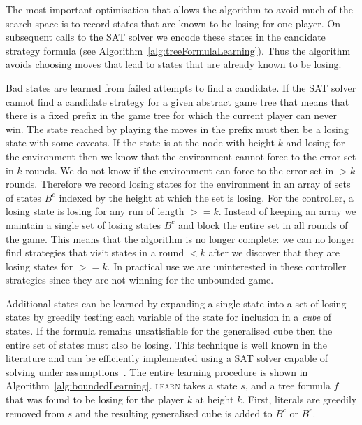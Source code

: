 The most important optimisation that allows the algorithm to avoid much of the search space is to record states that are known to be losing for one player. On subsequent calls to the SAT solver we encode these states in the candidate strategy formula (see Algorithm~\ref{alg:treeFormulaLearning}). Thus the algorithm avoids choosing moves that lead to states that are already known to be losing.

Bad states are learned from failed attempts to find a candidate. If the SAT solver cannot find a candidate strategy for a given abstract game tree that means that there is a fixed prefix in the game tree for which the current player can never win. The state reached by playing the moves in the prefix must then be a losing state with some caveats. If the state is at the node with height $k$ and losing for the environment then we know that the environment cannot force to the error set in $k$ rounds. We do not know if the environment can force to the error set in $> k$ rounds. Therefore we record losing states for the environment in an array of sets of states $B^e$ indexed by the height at which the set is losing. For the controller, a losing state is losing for any run of length $>= k$. Instead of keeping an array we maintain a single set of losing states $B^c$ and block the entire set in all rounds of the game. This means that the algorithm is no longer complete: we can no longer find strategies that visit states in a round $<k$ after we discover that they are losing states for $>=k$. In practical use we are uninterested in these controller strategies since they are not winning for the unbounded game.

Additional states can be learned by expanding a single state into a set of losing states by greedily testing each variable of the state for inclusion in a \emph{cube} of states. If the formula remains unsatisfiable for the generalised cube then the entire set of states must also be losing. This technique is well known in the literature and can be efficiently implemented using a SAT solver capable of solving under assumptions~\cite{Een03}. The entire learning procedure is shown in Algorithm~\ref{alg:boundedLearning}. \textsc{learn} takes a state $s$, and a tree formula $f$ that was found to be losing for the player $k$ at height $k$. First, literals are greedily removed from $s$ and the resulting generalised cube is added to $B^c$ or $B^e$.

